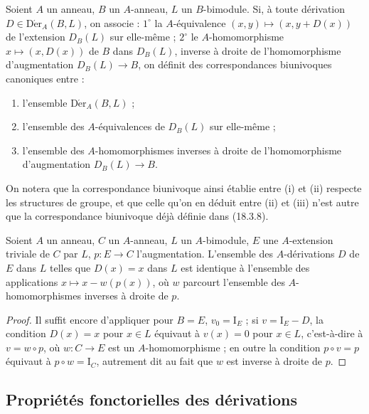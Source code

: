 \begin{corollary}[20.1.6]
\label{0.20.1.6-fr}
Soient $A$ un anneau, $B$ un $A$-anneau, $L$ un $B$-bimodule. Si, à toute
dérivation $D\in\operatorname{D\acute{e}r}_A(B,L)$, on associe : $1^\circ$ la
$A$-équivalence $(x,y)\mapsto(x,y+D(x))$ de l'extension $D_B(L)$ sur
elle-même ; $2^\circ$ le $A$-homomorphisme $x\mapsto(x,D(x))$ de $B$ dans
$D_B(L)$, inverse à droite de l'homomorphisme d'augmentation $D_B(L)\to B$,
on définit des correspondances biunivoques canoniques entre :
\begin{enumerate}
  \item[\rm(i)] l'ensemble $\operatorname{D\acute{e}r}_A(B,L)$ ;
  \item[\rm(ii)] l'ensemble des $A$-équivalences de $D_B(L)$ sur elle-même ;
  \item[\rm(iii)] l'ensemble des $A$-homomorphismes inverses à droite de
  l'homomorphisme d'augmentation $D_B(L)\to B$.
\end{enumerate}
\end{corollary}

On notera que la correspondance biunivoque ainsi établie entre (i) et (ii)
respecte les structures de groupe, et que celle qu'on en déduit entre (ii) et
(iii) n'est autre que la correspondance biunivoque déjà définie dans (18.3.8).

\begin{corollary}[20.1.7]
\label{0.20.1.7-fr}
Soient $A$ un anneau, $C$ un $A$-anneau, $L$ un $A$-bimodule, $E$ une
$A$-extension triviale de $C$ par $L$, $p:E\to C$ l'augmentation. L'ensemble
des $A$-dérivations $D$ de $E$ dans $L$ telles que $D(x)=x$ dans $L$ est
identique à l'ensemble des applications $x\mapsto x-w(p(x))$, où $w$
parcourt l'ensemble des $A$-homomorphismes inverses à droite de $p$.
\end{corollary}

\begin{proof}
Il suffit encore d'appliquer  pour $B=E$,
$v_0=\mathrm{I}_E$ ; si $v=\mathrm{I}_E-D$, la condition $D(x)=x$ pour
$x\in L$ équivaut à $v(x)=0$ pour $x\in L$, c'est-à-dire à $v=w\circ p$,
où $w:C\to E$ est un $A$-homomorphisme ; en outre la condition
$p\circ v=p$ équivaut à $p\circ w=\mathrm{I}_C$, autrement dit au fait que
$w$ est inverse à droite de $p$.
\end{proof}

\subsection{Propriétés fonctorielles des dérivations}
\label{subsection:0.20.2-fr}

